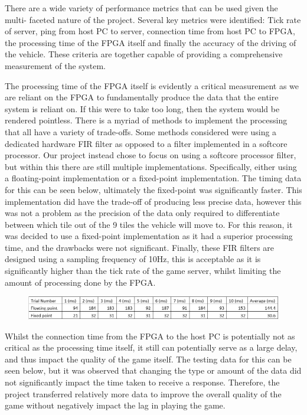 \documentclass[12pt,a4paper]{article}
\begin{document}
{\scriptsize There are a wide variety of performance metrics that can be used given the multi-
faceted nature of the project. Several key metrics were identified: Tick rate of 
server, ping from host PC to server, connection time from host PC to FPGA, the 
processing time of the FPGA itself and finally the accuracy of the driving of 
the vehicle. These criteria are together capable of providing a comprehensive 
measurement of the system. }
\par
{\scriptsize The processing time of the FPGA itself is evidently a critical measurement as we 
are reliant on the FPGA to fundamentally produce the data that the entire system 
is reliant on. If this were to take too long, then the system would be rendered 
pointless. There is a myriad of methods to implement the processing that all have 
a variety of trade-offs. Some methods considered were using a dedicated hardware 
FIR filter as opposed to a filter implemented in a softcore processor. Our project 
instead chose to focus on using a softcore processor filter, but within this there 
are still multiple implementations. Specifically, either using a floating-point 
implementation or a fixed-point implementation. The timing data for this can be 
seen below, ultimately the fixed-point was significantly faster. This implementation
 did have the trade-off of producing less precise data, however this was not a 
 problem as the precision of the data only required to differentiate between which 
 tile out of the 9 tiles the vehicle will move to. For this reason, it was decided 
 to use a fixed-point implementation as it had a superior processing time, and the 
 drawbacks were not significant. Finally, these FIR filters are designed using a 
 sampling frequency of 10Hz, this is acceptable as it is significantly higher than 
 the tick rate of the game server, whilst limiting the amount of processing done by 
 the FPGA.}
 \par
 \begin{figure} [h!]
    \centering
    \includegraphics[scale = 0.5]{Point.png}
 \end{figure}
 \par
 {\scriptsize Whilst the connection time from the FPGA to the host PC is potentially not as 
 critical as the processing time itself, it still can potentially serve as a 
 large delay, and thus impact the quality of the game itself. The testing data 
 for this can be seen below, but it was observed that changing the type or amount 
 of the data did not significantly impact the time taken to receive a response. 
 Therefore, the project transferred relatively more data to improve the overall 
 quality of the game without negatively impact the lag in playing the game. }
\end{document}
